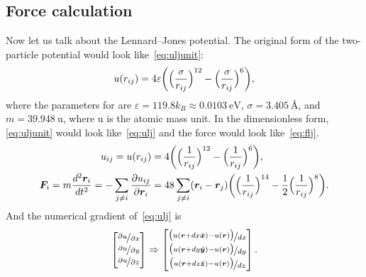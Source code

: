 \subsection{Force calculation}\label{ssec:force}

Now let us talk about the Lennard--Jones potential.
The original form of the two-particle potential would look like~\eqref{eq:uljunit}:
%
\begin{equation}\label{eq:uljunit}
    u(r_{ij}) = 4 \varepsilon \biggl( \Bigl( \frac{ \sigma }{ r_{ij} } \Bigr)^{12}
    -\Bigl( \frac{ \sigma }{ r_{ij} } \Bigr)^6 \biggr),
\end{equation}
%
where the parameters for  are $\varepsilon = 119.8 k_B \approx \SI{0.0103}{\electronvolt}$,
$\sigma = \SI{3.405}{\angstrom}$, and $m = \SI{39.948}{\atomicmassunit}$, where
$\si{\atomicmassunit}$ is the atomic mass unit.
In the dimensionless form,
\eqref{eq:uljunit} would look like~\eqref{eq:ulj} and the force would
look like~\eqref{eq:flj}.
%
\begin{align}
    u_{ij} = u(r_{ij}) & = 4 \biggl( \Bigl( \frac{ 1 }{ r_{ij} } \Bigr)^{12}
    -\Bigl( \frac{ 1 }{ r_{ij} } \Bigr)^6 \biggr), \label{eq:ulj}            \\
    \bm{F}_i = m\frac{ d^2 \bm{r}_i }{ d t^2 } = -\sum_{j \neq i}\frac{ \partial u_{ij} }{ \partial \bm{r}_i }
                       & = 48\sum_{j \neq i} (\bm{r}_i - \bm{r}_j)
    \biggl( \Bigl( \frac{ 1 }{ r_{ij} } \Bigr)^{14}
    -\frac{ 1 }{ 2 } \Bigl( \frac{ 1 }{ r_{ij} } \Bigr)^8 \biggr). \label{eq:flj}
\end{align}
%
And the numerical gradient of~\eqref{eq:ulj} is
%
\begin{equation}\label{eq:dudr}
    \begin{bmatrix}
        \nicefrac{ \partial u }{ \partial x } \\
        \nicefrac{ \partial u }{ \partial y } \\
        \nicefrac{ \partial u }{ \partial z }
    \end{bmatrix}
    \Rightarrow
    \begin{bmatrix}
        \nicefrac{ \bigl( u(\bm{r} + dx \hat{\bm{x}}) - u(\bm{r}) \bigr) }{ dx } \\
        \nicefrac{ \bigl( u(\bm{r} + dy \hat{\bm{y}}) - u(\bm{r}) \bigr) }{ dy } \\
        \nicefrac{ \bigl( u(\bm{r} + dz \hat{\bm{z}}) - u(\bm{r}) \bigr) }{ dz }
    \end{bmatrix}.
\end{equation}
